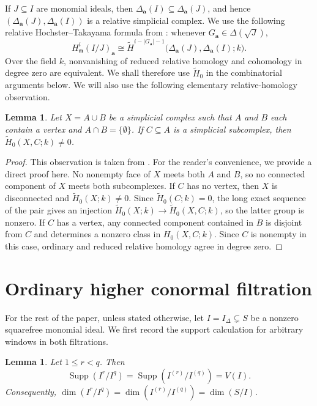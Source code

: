 \documentclass[12pt]{amsart}
\theoremstyle{plain}
\newtheorem{lemma}[theorem]{Lemma}
\theoremstyle{definition}
\theoremstyle{remark}
\begin{document}
If $J\subseteq I$ are monomial ideals, then
$\Delta_{\mathbf a}(I)\subseteq\Delta_{\mathbf a}(J)$, and hence
$(\Delta_{\mathbf a}(J),\Delta_{\mathbf a}(I))$ is a relative simplicial
complex. We use the following relative Hochster--Takayama formula from
\cite[Theorem~3.2]{HaMinh}: whenever
$G_{\mathbf a}\in\Delta(\sqrt J)$,
$$
H^i_{\mathfrak m}(I/J)_{\mathbf a}
\cong
\widetilde H^{i-|G_{\mathbf a}|-1}
\bigl(\Delta_{\mathbf a}(J),\Delta_{\mathbf a}(I);k\bigr).
$$
Over the field $k$, nonvanishing of reduced relative homology and cohomology in
degree zero are equivalent. We shall therefore use $\widetilde H_0$ in the
combinatorial arguments below. We will also use the following elementary
relative-homology observation.

\begin{lemma}\label{lem:relative-zero}
	Let $X=A\cup B$ be a simplicial complex such that $A$ and $B$ each contain a
	vertex and $A\cap B=\{\emptyset\}$. If $C\subseteq A$ is a simplicial
	subcomplex, then $\widetilde H_0(X,C;k)\neq0$.
\end{lemma}

\begin{proof} This observation is taken from \cite[Lemma 3.1]{MinhNakamura}. For the reader's convenience, we provide a direct proof here. No nonempty face of $X$ meets both $A$ and $B$, so no connected component of
	$X$ meets both subcomplexes. If $C$ has no vertex, then $X$ is disconnected and
	$\widetilde H_0(X;k)\neq0$. Since $\widetilde H_0(C;k)=0$, the long exact
	sequence of the pair gives an injection
	$\widetilde H_0(X;k)\to\widetilde H_0(X,C;k)$, so the latter group is nonzero.
	If $C$ has a vertex, any connected component contained in $B$ is disjoint from
	$C$ and determines a nonzero class in $H_0(X,C;k)$. Since $C$ is nonempty in
	this case, ordinary and reduced relative homology agree in degree zero.
\end{proof}

\section{Ordinary higher conormal filtration}\label{sec:ordinary}

For the rest of the paper, unless stated otherwise, let
$I=I_\Delta\subsetneq S$ be a nonzero squarefree monomial ideal. We first
record the support calculation for arbitrary windows in both filtrations.

\begin{lemma}\label{lem:support}
Let $1\le r<q$. Then
$$
\operatorname{Supp}(I^r/I^q)
=
\operatorname{Supp}(I^{(r)}/I^{(q)})
=
V(I).
$$
Consequently,
$\dim(I^r/I^q)=\dim(I^{(r)}/I^{(q)})=\dim(S/I)$.
\end{lemma}
\end{document}
